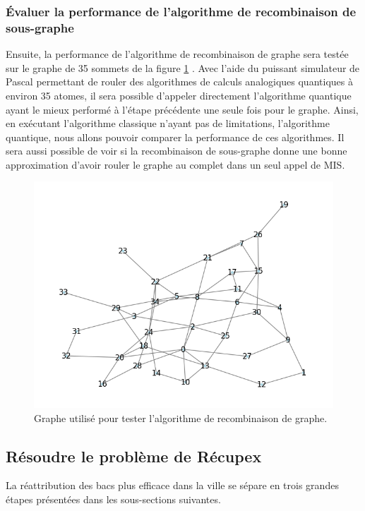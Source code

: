 \documentclass[11pt]{article}
\begin{document}
\subsubsection{Évaluer la performance de l'algorithme de recombinaison de sous-graphe}
Ensuite, la performance de l'algorithme de recombinaison de graphe sera testée sur le graphe de 35 sommets de la figure \ref{35atoms} . Avec l'aide du puissant simulateur de Pascal permettant de rouler des algorithmes de calculs analogiques quantiques à environ 35 atomes, il sera possible d'appeler directement l'algorithme quantique ayant le mieux performé à l'étape précédente une seule fois pour le graphe. Ainsi, en exécutant l'algorithme classique n'ayant pas de limitations, l'algorithme quantique, nous allons pouvoir comparer la performance de ces algorithmes. Il sera aussi possible de voir si la recombinaison de sous-graphe donne une bonne approximation d'avoir rouler le graphe au complet dans un seul appel de MIS.


\begin{figure}[H]
    \centering
    \includegraphics[width=0.49\linewidth]{images/35atomes.png}
    \caption{Graphe utilisé pour tester l'algorithme de recombinaison de graphe.}
    \label{35atoms}
\end{figure}

\subsection{Résoudre le problème de Récupex}
La réattribution des bacs plus efficace dans la ville se sépare en trois grandes étapes présentées dans les sous-sections suivantes.
\end{document}

